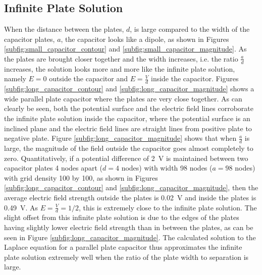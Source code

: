 \subsection{Infinite Plate Solution}
\label{subsec:infinite_plate_solution}

When the distance between the plates, $d$, is large compared to the width of the capacitor plates, $a$, the capacitor looks like a dipole, as shown in Figures \ref{subfig:small_capacitor_contour} and \ref{subfig:small_capacitor_magnitude}. As the plates are brought closer together and the width increases, i.e. the ratio $\frac{a}{d}$ increases, the solution looks more and more like the infinite plate solution, namely $E=0$ outside the capacitor and $E = \frac{V}{d}$ inside the capacitor. Figures \ref{subfig:long_capacitor_contour} and \ref{subfig:long_capacitor_magnitude} shows a wide parallel plate capacitor where the plates are very close together. As can clearly be seen, both the potential surface and the electric field lines corroborate the infinite plate solution inside the capacitor, where the potential surface is an inclined plane and the electric field lines are straight lines from positive plate to negative plate. Figure \ref{subfig:long_capacitor_magnitude} shows that when $\frac{a}{d}$ is large, the magnitude of the field outside the capacitor goes almost completely to zero. Quantitatively, if a potential difference of \SI{2}{V} is maintained between two capacitor plates 4 nodes apart ($d=4$ nodes) with width 98 nodes ($a=98$ nodes) with grid density 100 by 100, as shown in Figures \ref{subfig:long_capacitor_contour} and \ref{subfig:long_capacitor_magnitude}, then the average electric field strength outside the plates is \SI{0.02}{\volt} and inside the plates is \SI{0.49}{\volt}. As $E=\frac{V}{d}=1/2$, this is extremely close to the infinite plate solution. The slight offset from this infinite plate solution is due to the edges of the plates having slightly lower electric field strength than in between the plates, as can be seen in Figure \ref{subfig:long_capacitor_magnitude}. The calculated solution to the Laplace equation for a parallel plate capacitor thus approximates the infinite plate solution extremely well when the ratio of the plate width to separation is large.

